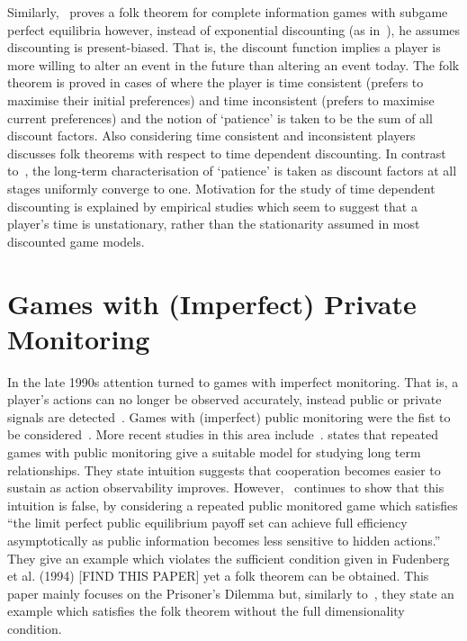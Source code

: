 Similarly,~\cite{Bernergard2019} proves a folk theorem for complete information
games with subgame perfect equilibria however, instead of exponential
discounting (as in~\cite{Abreu1994, Fudenberg1986}), he assumes discounting is
present-biased. That is, the discount function implies a player is more willing
to alter an event in the future than altering an event today. The folk theorem
is proved in cases of where the player is time consistent (prefers to maximise
their initial preferences) and time inconsistent (prefers to maximise current
preferences) and the notion of `patience' is taken to be the sum of all discount
factors. Also considering time consistent and inconsistent players~\cite{Li2019}
discusses folk theorems with respect to time dependent discounting. In contrast
to~\cite{Bernergard2019}, the long-term characterisation of `patience' is taken
as discount factors at all stages uniformly converge to one. Motivation for the
study of time dependent discounting is explained by empirical studies which seem
to suggest that a player's time is unstationary, rather than the stationarity
assumed in most discounted game models.


\section{Games with (Imperfect) Private Monitoring}\label{sec:Games_with_(Imperfect)_Private_Monitoring}
In the late 1990s attention turned to games with imperfect monitoring. That is,
a player's actions can no longer be observed accurately, instead public or
private signals are detected~\cite{Durlauf2016}. Games with (imperfect) public
monitoring were the fist to be considered~\cite{Matsushima2004}. More recent
studies in this area include~\cite{Kandori2006, Chassang2011}.
\cite{Kandori2006} states that repeated games with public monitoring give a
suitable model for studying long term relationships. They state intuition
suggests that cooperation becomes easier to sustain as action observability
improves. However,~\cite{Kandori2006} continues to show that this intuition is
false, by considering a repeated public monitored game which satisfies ``the
limit perfect public equilibrium payoff set can achieve full efficiency
asymptotically as public information becomes less sensitive to hidden actions.''
They give an example which violates the sufficient condition given in Fudenberg
et al. (1994) [FIND THIS PAPER] yet a folk theorem can be obtained. This paper mainly focuses on
the Prisoner's Dilemma but, similarly to~\cite{Abreu1994}, they state an example
which satisfies the folk theorem without the full dimensionality condition. 


